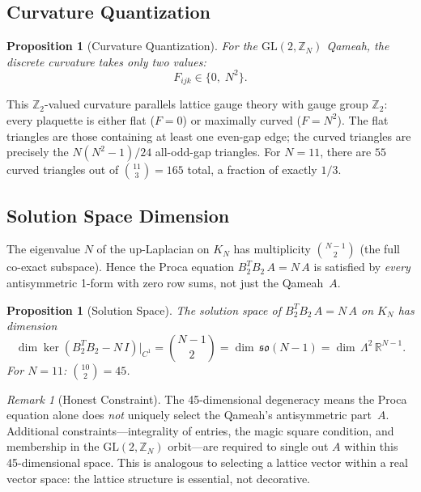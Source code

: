 \documentclass[aip,jmp,reprint,superscriptaddress,floatfix,nofootinbib]{revtex4-2}
\newtheorem{proposition}[theorem]{Proposition}
\theoremstyle{definition}
\theoremstyle{remark}
\newtheorem{remark}[theorem]{Remark}
\newcommand{\ZN}{\mathbb{Z}_N}
\newcommand{\GL}{\mathrm{GL}}
\begin{document}
\subsection{Curvature Quantization}
\label{sec:proca:curvature}

\begin{proposition}[Curvature Quantization]\label{prop:F-quant}
For the $\GL(2,\ZN)$ Qameah, the discrete curvature takes only
two values:
\begin{equation}\label{eq:F-quant}
F_{ijk} \in \{0,\; N^2\}.
\end{equation}
\end{proposition}

This $\mathbb{Z}_2$-valued curvature parallels lattice gauge theory
with gauge group $\mathbb{Z}_2$: every plaquette is either flat
($F = 0$) or maximally curved ($F = N^2$).  The flat triangles are
those containing at least one even-gap edge; the curved triangles are
precisely the $N(N^2{-}1)/24$ all-odd-gap triangles.  For $N = 11$,
there are $55$ curved triangles out of $\binom{11}{3} = 165$ total,
a fraction of exactly $1/3$.

\subsection{Solution Space Dimension}
\label{sec:proca:solspace}

The eigenvalue $N$ of the up-Laplacian on $K_N$ has multiplicity
$\binom{N{-}1}{2}$ (the full co-exact subspace).  Hence the Proca
equation $B_2^T B_2\, A = N\,A$ is satisfied by \emph{every}
antisymmetric 1-form with zero row sums, not just the Qameah~$A$.

\begin{proposition}[Solution Space]\label{prop:solspace}
The solution space of $B_2^T B_2\, A = N\,A$ on $K_N$ has dimension
\begin{equation}\label{eq:solspace}
\dim \ker(B_2^T B_2 - N\,I)\big|_{C^1}
  = \binom{N{-}1}{2}
  = \dim\,\mathfrak{so}(N{-}1)
  = \dim\,\Lambda^2\,\mathbb{R}^{N-1}.
\end{equation}
For $N = 11$: $\binom{10}{2} = 45$.
\end{proposition}

\begin{remark}[Honest Constraint]
The 45-dimensional degeneracy means the Proca equation alone does
\emph{not} uniquely select the Qameah's antisymmetric part~$A$.
Additional constraints---integrality of entries, the magic square
condition, and membership in the $\GL(2,\ZN)$ orbit---are required
to single out $A$ within this 45-dimensional space.  This is
analogous to selecting a lattice vector within a real vector space:
the lattice structure is essential, not decorative.
\end{remark}
\end{document}
